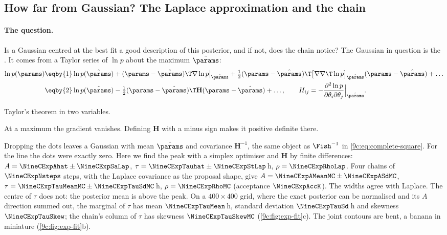 \subsection{How far from Gaussian? The Laplace approximation and the chain}
\label{9c:sec:exp-laplace}

\paragraph{The question.} Is a Gaussian centred at the best fit a good description of this
posterior, and if not, does the chain notice? The Gaussian in question is the
 . It comes from a Taylor series of $\ln p$ about the maximum $\hat\params$:
\begin{align}
  \ln p(\params)
  &\eqby{1}\ln p(\hat\params)+(\params-\hat\params)\T\nabla\ln p\big|_{\hat\params}
     +\tfrac12(\params-\hat\params)\T\bigl[\nabla\nabla\T\ln p\bigr]_{\hat\params}(\params-\hat\params)+\dots
  \nonumber\\
  &\eqby{2}\ln p(\hat\params)-\tfrac12(\params-\hat\params)\T\mathbf H(\params-\hat\params)+\dots,
  \qquad H_{ij}=-\frac{\partial^2\ln p}{\partial\theta_i\partial\theta_j}\Big|_{\hat\params}.
  \label{9c:eq:laplace}
\end{align}
\begin{explain}
  \item Taylor's theorem in two variables.
  \item At a maximum the gradient vanishes. Defining $\mathbf H$ with a minus sign makes it positive
        definite there.
\end{explain}
Dropping the dots leaves a Gaussian with mean $\hat\params$ and covariance $\mathbf H^{-1}$, the same
object as $\Fish^{-1}$ in \eqref{9c:eq:complete-square}. For the line the dots were exactly zero. Here
we find the peak with a simplex optimiser and $\mathbf H$ by finite differences: $A=\NineCExpAhat\pm\NineCExpSaLap$,
$\tau=\NineCExpTauhat\pm\NineCExpStLap$\,h, $\rho=\NineCExpRhoLap$. Four chains of $\NineCExpNsteps$ steps,
with the Laplace covariance as the proposal shape, give $A=\NineCExpAMeanMC\pm\NineCExpASdMC$,
$\tau=\NineCExpTauMeanMC\pm\NineCExpTauSdMC$\,h, $\rho=\NineCExpRhoMC$ (acceptance $\NineCExpAccK$). The
widths agree with Laplace. The centre of $\tau$ does not: the posterior mean is above the peak. On a
$400\times400$ grid, where the exact posterior can be normalised and its $A$ direction summed out,
the marginal of $\tau$ has mean $\NineCExpTauMean$\,h, standard deviation $\NineCExpTauSd$\,h and
skewness $\NineCExpTauSkew$; the chain's column of $\tau$ has skewness $\NineCExpTauSkewMC$
(\cref{9c:fig:exp-fit}c). The joint contours are bent, a banana in miniature
(\cref{9c:fig:exp-fit}b).

